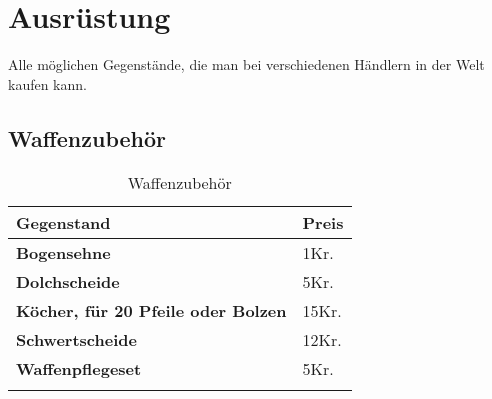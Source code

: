 {\let\clearpage\relax\chapter{Ausrüstung}}
Alle möglichen Gegenstände, die man bei verschiedenen Händlern in der Welt kaufen kann.

\section{Waffenzubehör} 
\begin{longtable}{|p{5cm}|p{2cm}|}
\hline
\textbf{Gegenstand} & \textbf{Preis} \\ \hline
\textbf{Bogensehne} & 1Kr. \\ \hline
\textbf{Dolchscheide} & 5Kr. \\ \hline
\textbf{Köcher, für 20 Pfeile oder Bolzen} & 15Kr. \\ \hline
\textbf{Schwertscheide} & 12Kr. \\ \hline
\textbf{Waffenpflegeset} & 5Kr. \\ \hline

\caption{Waffenzubehör}
\label{tab:Waffenzubehör}
\end{longtable}

